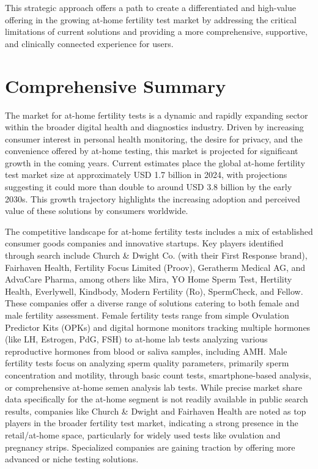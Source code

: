 \documentclass{article}
\begin{document}
This strategic approach offers a path to create a differentiated and high-value offering in the growing at-home fertility test market by addressing the critical limitations of current solutions and providing a more comprehensive, supportive, and clinically connected experience for users.

\section{Comprehensive Summary}

The market for at-home fertility tests is a dynamic and rapidly expanding sector within the broader digital health and diagnostics industry. Driven by increasing consumer interest in personal health monitoring, the desire for privacy, and the convenience offered by at-home testing, this market is projected for significant growth in the coming years. Current estimates place the global at-home fertility test market size at approximately USD 1.7 billion in 2024, with projections suggesting it could more than double to around USD 3.8 billion by the early 2030s. This growth trajectory highlights the increasing adoption and perceived value of these solutions by consumers worldwide.

The competitive landscape for at-home fertility tests includes a mix of established consumer goods companies and innovative startups. Key players identified through search include Church \& Dwight Co. (with their First Response brand), Fairhaven Health, Fertility Focus Limited (Proov), Geratherm Medical AG, and AdvaCare Pharma, among others like Mira, YO Home Sperm Test, Hertility Health, Everlywell, Kindbody, Modern Fertility (Ro), SpermCheck, and Fellow. These companies offer a diverse range of solutions catering to both female and male fertility assessment. Female fertility tests range from simple Ovulation Predictor Kits (OPKs) and digital hormone monitors tracking multiple hormones (like LH, Estrogen, PdG, FSH) to at-home lab tests analyzing various reproductive hormones from blood or saliva samples, including AMH. Male fertility tests focus on analyzing sperm quality parameters, primarily sperm concentration and motility, through basic count tests, smartphone-based analysis, or comprehensive at-home semen analysis lab tests. While precise market share data specifically for the at-home segment is not readily available in public search results, companies like Church \& Dwight and Fairhaven Health are noted as top players in the broader fertility test market, indicating a strong presence in the retail/at-home space, particularly for widely used tests like ovulation and pregnancy strips. Specialized companies are gaining traction by offering more advanced or niche testing solutions.
\end{document}
